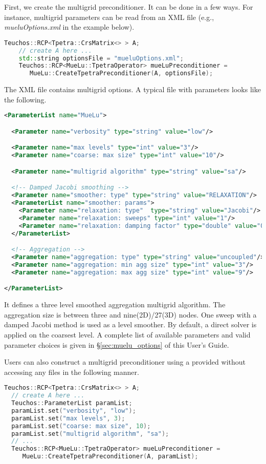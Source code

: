 First, we create the \muelu{} multigrid preconditioner. It can be done in a few
ways. For instance, multigrid parameters can be read from an XML file
(e.g., \textit{mueluOptions.xml} in the example below).
\begin{lstlisting}[language=C++]
    Teuchos::RCP<Tpetra::CrsMatrix<> > A;
    // create A here ...
    std::string optionsFile = "mueluOptions.xml";
    Teuchos::RCP<MueLu::TpetraOperator> mueLuPreconditioner =
       MueLu::CreateTpetraPreconditioner(A, optionsFile);
\end{lstlisting}
The XML file contains multigrid options. A typical file with \muelu{} parameters
looks like the following.
\begin{lstlisting}[language=XML]
<ParameterList name="MueLu">

  <Parameter name="verbosity" type="string" value="low"/>

  <Parameter name="max levels" type="int" value="3"/>
  <Parameter name="coarse: max size" type="int" value="10"/>

  <Parameter name="multigrid algorithm" type="string" value="sa"/>

  <!-- Damped Jacobi smoothing -->
  <Parameter name="smoother: type" type="string" value="RELAXATION"/>
  <ParameterList name="smoother: params">
    <Parameter name="relaxation: type"  type="string" value="Jacobi"/>
    <Parameter name="relaxation: sweeps" type="int" value="1"/>
    <Parameter name="relaxation: damping factor" type="double" value="0.9"/>
  </ParameterList>

  <!-- Aggregation -->
  <Parameter name="aggregation: type" type="string" value="uncoupled"/>
  <Parameter name="aggregation: min agg size" type="int" value="3"/>
  <Parameter name="aggregation: max agg size" type="int" value="9"/>

</ParameterList>
\end{lstlisting}
It defines a three level smoothed aggregation multigrid algorithm. The
aggregation size is between three and nine(2D)/27(3D) nodes.  One sweep with a
damped Jacobi method is used as a level smoother. By default, a direct solver is
applied on the coarsest level. A complete list of available parameters and valid
parameter choices is given in \S\ref{sec:muelu_options} of this User's Guide.

Users can also construct a multigrid preconditioner using a provided \parameterlist
without accessing any files in the following manner.
\begin{lstlisting}[language=C++]
  Teuchos::RCP<Tpetra::CrsMatrix<> > A;
  // create A here ...
  Teuchos::ParameterList paramList;
  paramList.set("verbosity", "low");
  paramList.set("max levels", 3);
  paramList.set("coarse: max size", 10);
  paramList.set("multigrid algorithm", "sa");
  // ...
  Teuchos::RCP<MueLu::TpetraOperator> mueLuPreconditioner =
     MueLu::CreateTpetraPreconditioner(A, paramList);
\end{lstlisting}

